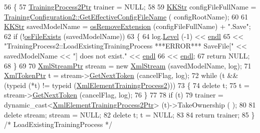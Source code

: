 \begin{DoxyCode}
56 \{
57   \hyperlink{class_k_k_m_l_l_1_1_training_process2}{TrainingProcess2Ptr}  trainer = NULL;
58 
59   \hyperlink{class_k_k_b_1_1_k_k_str}{KKStr}  configFileFullName = 
      \hyperlink{class_k_k_m_l_l_1_1_training_configuration2_a1805f10e0a83f752f0d501de6c11b3c3}{TrainingConfiguration2::GetEffectiveConfigFileName} (
      configRootName);
60 
61   \hyperlink{class_k_k_b_1_1_k_k_str}{KKStr}  savedModelName = \hyperlink{namespace_k_k_b_a13b1a6f4e074969602dbe4bf9022a9c6}{osRemoveExtension} (configFileFullName) + \textcolor{stringliteral}{".Save"};
62   \textcolor{keywordflow}{if}  (!\hyperlink{namespace_k_k_b_aba5c7fcb492dea01f2115c492ff65d83}{osFileExists} (savedModelName))
63   \{
64     log.\hyperlink{class_k_k_b_1_1_run_log_a32cf761d7f2e747465fd80533fdbb659}{Level} (-1) << \hyperlink{namespace_k_k_b_ad1f50f65af6adc8fa9e6f62d007818a8}{endl}
65       << \textcolor{stringliteral}{"TrainingProcess2::LoadExistingTrainingProcess   ***ERROR***    SaveFile["} << savedModelName << \textcolor{stringliteral}{"]
        does not exist."} << \hyperlink{namespace_k_k_b_ad1f50f65af6adc8fa9e6f62d007818a8}{endl}
66       << \hyperlink{namespace_k_k_b_ad1f50f65af6adc8fa9e6f62d007818a8}{endl};
67     \textcolor{keywordflow}{return} NULL;
68   \}
69 
70   \hyperlink{class_k_k_b_1_1_xml_stream}{XmlStreamPtr}  stream = \textcolor{keyword}{new} \hyperlink{class_k_k_b_1_1_xml_stream}{XmlStream} (savedModelName, log);
71   \hyperlink{class_k_k_b_1_1_xml_token}{XmlTokenPtr}  t = stream->\hyperlink{class_k_k_b_1_1_xml_stream_a87cc738b05c666cf5d5c25beaab477b4}{GetNextToken} (cancelFlag, log);
72   \textcolor{keywordflow}{while}  (t  &&  (\textcolor{keyword}{typeid} (*t)  !=  \textcolor{keyword}{typeid} (\hyperlink{class_k_k_b_1_1_xml_element_template}{XmlElementTrainingProcess2})))
73   \{
74     \textcolor{keyword}{delete}  t;
75     t = stream->\hyperlink{class_k_k_b_1_1_xml_stream_a87cc738b05c666cf5d5c25beaab477b4}{GetNextToken} (cancelFlag, log);
76   \}
77 
78   \textcolor{keywordflow}{if}  (t)
79     trainer = \textcolor{keyword}{dynamic\_cast<}\hyperlink{class_k_k_b_1_1_xml_element_template}{XmlElementTrainingProcess2Ptr}\textcolor{keyword}{>} (t)->TakeOwnership (
      );
80 
81   \textcolor{keyword}{delete}  stream;  stream = NULL;
82   \textcolor{keyword}{delete}  t;       t      = NULL;
83 
84   \textcolor{keywordflow}{return}  trainer;
85 \}  \textcolor{comment}{/* LoadExistingTrainingProcess */}
\end{DoxyCode}
